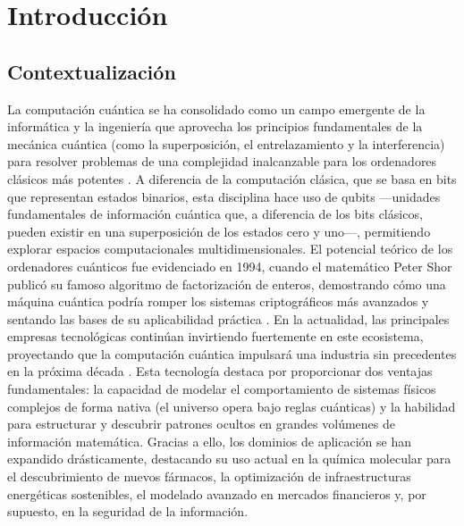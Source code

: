 \chapter{Introducción}
\label{chap:introduccion}
\section{Contextualización}

La computación cuántica se ha consolidado como un campo emergente de la informática y la ingeniería que aprovecha los principios fundamentales de la mecánica cuántica (como la superposición, el entrelazamiento y la interferencia) para resolver problemas de una complejidad inalcanzable para los ordenadores clásicos más potentes \cite{ibm_what_is_quantum}. A diferencia de la computación clásica, que se basa en bits que representan estados binarios, esta disciplina hace uso de qubits —unidades fundamentales de información cuántica que, a diferencia de los bits clásicos, pueden existir en una superposición de los estados cero y uno—, permitiendo explorar espacios computacionales multidimensionales. El potencial teórico de los ordenadores cuánticos fue evidenciado en 1994, cuando el matemático Peter Shor publicó su famoso algoritmo de factorización de enteros, demostrando cómo una máquina cuántica podría romper los sistemas criptográficos más avanzados y sentando las bases de su aplicabilidad práctica \cite{shor_algorithms_1994}. En la actualidad, las principales empresas tecnológicas continúan invirtiendo fuertemente en este ecosistema, proyectando que la computación cuántica impulsará una industria sin precedentes en la próxima década \cite{mckinsey_quantum_2023}. Esta tecnología destaca por proporcionar dos ventajas fundamentales: la capacidad de modelar el comportamiento de sistemas físicos complejos de forma nativa (el universo opera bajo reglas cuánticas) y la habilidad para estructurar y descubrir patrones ocultos en grandes volúmenes de información matemática. Gracias a ello, los dominios de aplicación se han expandido drásticamente, destacando su uso actual en la química molecular para el descubrimiento de nuevos fármacos, la optimización de infraestructuras energéticas sostenibles, el modelado avanzado en mercados financieros y, por supuesto, en la seguridad de la información.

